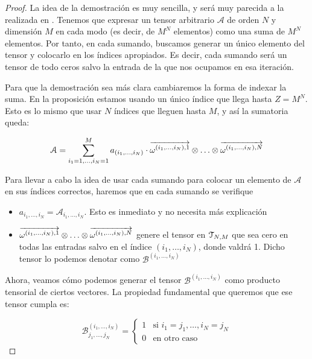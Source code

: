\begin{proof}
    La idea de la demostración es muy sencilla, y será muy parecida a la realizada en . Tenemos que expresar un tensor arbitrario $\mathcal{A}$ de orden $N$ y dimensión $M$ en cada modo (es decir, de $M^N$ elementos) como una suma de $M^N$ elementos. Por tanto, en cada sumando, buscamos generar un único elemento del tensor y colocarlo en los índices apropiados. Es decir, cada sumando será un tensor de todo ceros salvo la entrada de la que nos ocupamos en esa iteración.

    Para que la demostración sea más clara cambiaremos la forma de indexar la suma. En la proposición estamos usando un único índice que llega hasta $Z = M^N$. Esto es lo mismo que usar $N$ índices que lleguen hasta $M$, y así la sumatoria queda:

    \begin{equation}
        \mathcal{A} = \sum_{i_1 = 1, \ldots, i_N = 1}^M a_{(i_1, \ldots, i_N)} \cdot \overrightarrow{\omega^{(i_1, \ldots, i_N), 1}} \otimes \ldots \otimes \overrightarrow{\omega^{(i_1, \ldots, i_N), N}}
    \end{equation}

    Para llevar a cabo la idea de usar cada sumando para colocar un elemento de $\mathcal{A}$ en sus índices correctos, haremos que en cada sumando se verifique

    \begin{itemize}
        \item $a_{i_1, \ldots, i_N} = \mathcal{A}_{i_1, \ldots, i_N}$. Esto es inmediato y no necesita más explicación
        \item $\overrightarrow{\omega^{(i_1, \ldots, i_N), 1}} \otimes \ldots \otimes \overrightarrow{\omega^{(i_1, \ldots, i_N), N}}$ genere el tensor en $\mathcal{T}_{N, M}$ que sea cero en todas las entradas salvo en el índice $(i_1, \ldots, i_N)$, donde valdrá 1. Dicho tensor lo podemos denotar como  $\mathcal{B}^{(i_1, \ldots, i_N)}$
    \end{itemize}

    Ahora, veamos cómo podemos generar el tensor $\mathcal{B}^{(i_1, \ldots, i_N)}$ como producto tensorial de ciertos vectores. La propiedad fundamental que queremos que ese tensor cumpla es:

    \begin{equation}
        \mathcal{B}^{(i_1, \ldots, i_N)}_{j_1, \ldots, j_N} =
        \begin{cases}
            1 & \text{si } i_1 = j_1, \ldots, i_N = j_N \\
            0 & \text{en otro caso}
        \end{cases}
    \end{equation}


\end{proof}
